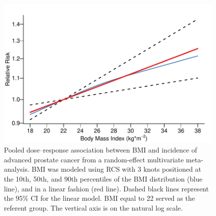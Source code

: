 \begin{figure}[h]
\centering
\includegraphics[width=\linewidth]{figures/pool_adv.pdf}
\caption[Pooled dose--response association between BMI and incidence of advanced prostate cancer from a random-effect multivariate meta-analysis]{Pooled dose--response association between BMI and incidence of advanced prostate cancer from a random-effect multivariate meta-analysis. BMI was modeled using RCS with 3 knots positioned at the 10th, 50th, and 90th percentiles of the BMI distribution (blue line), and in a linear fashion (red line). Dashed black lines represent the 95\% CI for the linear model. BMI equal to 22 \kgmsq{} served as the referent group. The vertical axis is on the natural log scale.}
\label{fig:pool_adv}
\end{figure}


